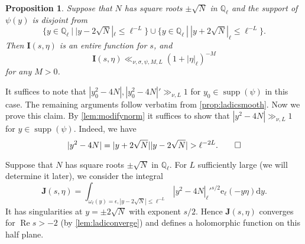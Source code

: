 \documentclass[10pt,oneside,reqno]{amsart}
\makeatletter
\newcommand\rmd{\mathrm{d}}
\newcommand\rme{\mathrm{e}}
\newcommand\bI{\mathbf{I}}
\newcommand\bJ{\mathbf{J}}
\newcommand\QQ{\mathbb{Q}}
\renewcommand\Re{\mathop{\mathrm{Re}}}
\DeclareMathOperator\supp{supp}
\renewcommand\leq{\leqslant}
\theoremstyle{THEOREM}
\newtheorem{proposition}[theorem]{Proposition}
\theoremstyle{DEFINITION}
\theoremstyle{EXERCISE}
\numberwithin{equation}{section}
\renewenvironment{proof}[1][\proofname]{\par
  \vspace{-6pt}
  \pushQED{\qed}
  \normalfont \topsep6\p@\@plus6\p@\relax
  \trivlist
  \item[\hskip\labelsep\rmfamily\bfseries
    #1\@addpunct{:}]\ignorespaces
}{
  \popQED\endtrivlist\@endpefalse
  \vspace{-6pt}
}
\makeatother
\begin{document}
\begin{proposition}\label{prop:ladicnonsingular}
Suppose that $N$ has square roots $\pm \sqrt{N}$ in $\QQ_\ell$ and the support of $\psi(y)$ is disjoint from
\[
\{y\in \QQ_\ell\ |\ |y-2\sqrt{N}|_\ell \leq \ell^{-L}\}\cup \{y\in \QQ_\ell\ |\ |y+2\sqrt{N}|_\ell\leq \ell^{-L}\}.
\]
Then $\bI(s,\eta)$ is an entire function for $s$, and
\[
\bI(s,\eta)\ll_{\nu,\sigma,\psi,M,L} (1+|\eta|_\ell)^{-M}
\]
for any $M>0$.
\end{proposition}
\begin{proof}
It suffices to note that $|y_0^2-4N|,|y_0^2-4N|'\gg_{\nu,L} 1$ for $y_0\in \supp(\psi)$ in this case. The remaining arguments follow verbatim from \autoref{prop:ladicsmooth}. Now we prove this claim. By \autoref{lem:modifynorm} it suffices to show that $|y^2-4N|\gg_{\nu,L} 1$ for $y\in \supp(\psi)$. Indeed, we have
\[
|y^2-4N|=|y+2\sqrt{N}||y-2\sqrt{N}|> \ell^{-2L}.\qedhere
\]
\end{proof}

Suppose that $N$ has square roots $\pm \sqrt{N}$ in $\QQ_\ell$. For $L$ sufficiently large (we will determine it later), we consider the integral
\begin{equation}\label{eq:ladicfouriersupport}
\bJ(s,\eta)=\int_{\omega_\ell(y)=\epsilon, |y-2\sqrt{N}|\leq \ell^{-L}}|y^2-4N|_\ell'^{s/2} \rme_\ell(-y\eta)\rmd y.
\end{equation}
It has singularities at $y=\pm 2\sqrt{N}$ with exponent $s/2$. Hence $\bJ(s,\eta)$ converges for $\Re s>-2$ (by \autoref{lem:ladiconverge}) and defines a holomorphic function on this half plane.
\end{document}
